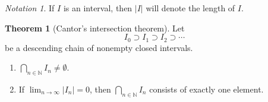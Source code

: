 \documentclass[10pt,letterpaper,cm]{nupset}
\theoremstyle{definition}
\theoremstyle{theorem}
\newtheorem{theorem}[definition]{Theorem}
\theoremstyle{remark}
\newtheorem*{notation}{Notation}
\newcommand{\N}{\mathbb N}
\newcommand{\1}{\mathbf{1}}
\newcommand{\0}{\vec 0}
\begin{document}
\begin{notation}
If $I$ is an interval, then $\left\lvert{I}\right\rvert$ will denote the length of $I$.
\end{notation}

\begin{theorem}[Cantor's intersection theorem] Let $$I_0 \supset I_1 \supset I_2 \supset \cdots $$ be a descending chain of nonempty closed intervals.
\begin{enumerate}
\item $\bigcap_{n\in \N} I_n \ne \emptyset$.
\item If $\lim_{n\to \infty} \left\lvert{I_n}\right\rvert =0$, then $\bigcap_{n\in \N} I_n$ consists of exactly one element. 
\end{enumerate}
\end{theorem}
\end{document}
